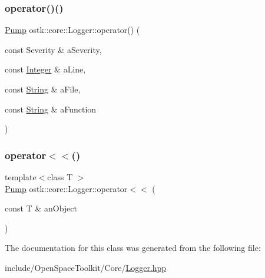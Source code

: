 \mbox{\label{classostk_1_1core_1_1_logger_a7d8033ccf22cdd2e2ba642517dada6d3}} 
\subsubsection{\texorpdfstring{operator()()}{operator()()}}
{\footnotesize\ttfamily \hyperlink{classostk_1_1core_1_1logger_1_1_pump}{Pump} ostk\+::core\+::\+Logger\+::operator() (\begin{DoxyParamCaption}\item[{const Severity \&}]{a\+Severity,  }\item[{const \hyperlink{classostk_1_1core_1_1types_1_1_integer}{Integer} \&}]{a\+Line,  }\item[{const \hyperlink{classostk_1_1core_1_1types_1_1_string}{String} \&}]{a\+File,  }\item[{const \hyperlink{classostk_1_1core_1_1types_1_1_string}{String} \&}]{a\+Function }\end{DoxyParamCaption})}

\mbox{\label{classostk_1_1core_1_1_logger_a546b882e7f79c120869d64221b0d554a}} 
\subsubsection{\texorpdfstring{operator$<$$<$()}{operator<<()}}
{\footnotesize\ttfamily template$<$class T $>$ \\
\hyperlink{classostk_1_1core_1_1logger_1_1_pump}{Pump} ostk\+::core\+::\+Logger\+::operator$<$$<$ (\begin{DoxyParamCaption}\item[{const T \&}]{an\+Object }\end{DoxyParamCaption})\hspace{0.3cm}{\ttfamily [inline]}}



The documentation for this class was generated from the following file\+:\begin{DoxyCompactItemize}
\item 
include/\+Open\+Space\+Toolkit/\+Core/\hyperlink{_logger_8hpp}{Logger.\+hpp}\end{DoxyCompactItemize}
